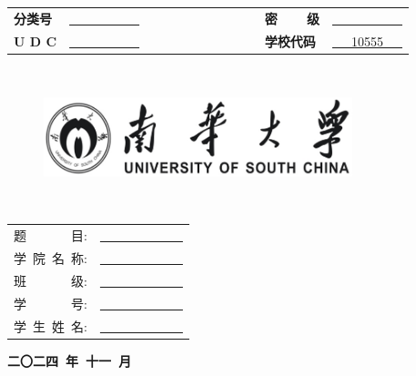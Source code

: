 \documentclass[a4paper,12pt]{article}
\newcommand{\doublebf}[1]{{\textbf{\textbf{\color{black}\scalebox{1.5}[1.5]{#1}}}}}
\begin{document}
\begin{center}
    \begin{tabular}{l l l l}
        {\fontsize{15pt}{12}\selectfont\textbf{分类号}} & {\fontsize{14pt}{12}\selectfont\underline{\ \ \ \ \ \ \ \ \ \ \ }} \ \ \ \ \ \ \ \ \ \ \ \ \ \ \ \ \ &{\fontsize{15pt}{12}\selectfont\textbf{密\ \ \ \ 级}} & {\fontsize{14pt}{12}\selectfont\underline{\ \ \ \ \ \ \ \ \ \ \ }}\vspace{1em}\\
        {\fontsize{15pt}{12}\selectfont\textbf{U D C}}&{\fontsize{14pt}{12}\selectfont\underline{\ \ \ \ \ \ \ \ \ \ \ }} &{\fontsize{15pt}{12}\selectfont\textbf{学校代码}} & {\fontsize{14pt}{12}\selectfont\underline{\ \ \ 10555\ \ \ }}  
         \\
    \end{tabular}\\
    \vspace{4em}
    \begin{figure}[htbp]
        \centering
        \includegraphics[width=0.8\textwidth]{南华大学.png}
    \end{figure}



    \vspace{4em}
    {\fontsize{25pt}{12}\selectfont\doublebf{【标题】}} \\

        
    

    \vspace{4em}

    \begin{tabular}{rl}
    \vspace{2em}
    {\fontsize{15pt}{12}\selectfont 题\ \ \ \ \ \ \ 目:} & {\fontsize{15pt}{12}\selectfont\underline{\ \ \ \ \ \ \ \ \ \ \ \ \ }} \\
    \vspace{2em}
    {\fontsize{15pt}{12}\selectfont 学\ 院\ 名\ 称: }& {\fontsize{15pt}{12}\selectfont\underline{\ \ \ \ \ \ \ \ \ \ \ \ \ }} \\
    \vspace{2em}
    {\fontsize{15pt}{12}\selectfont 班\ \ \ \ \ \ \ 级:} & {\fontsize{15pt}{12}\selectfont\underline{\ \ \ \ \ \ \ \ \ \ \ \ \ }} \\
    \vspace{2em}
    {\fontsize{15pt}{12}\selectfont 学\ \ \ \ \ \ \ 号}: & {\fontsize{15pt}{12}\selectfont\underline{\ \ \ \ \ \ \ \ \ \ \ \ \  }} \\
    \vspace{2em}
    {\fontsize{15pt}{12}\selectfont 学\ 生\ 姓\ 名: }& {\fontsize{15pt}{12}\selectfont\underline{\ \ \ \ \ \ \ \ \ \ \ \ \ }} \\
\end{tabular}

\vspace{2em}

    {\fontsize{18pt}{12}\selectfont \textbf{二〇二四\ 年\ 十一\ 月}}

\end{center}
\end{document}
